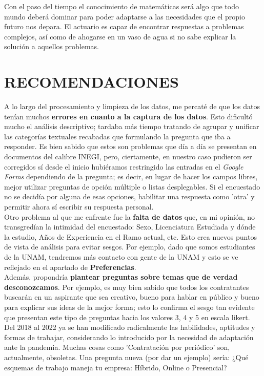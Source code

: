 \documentclass{article}
\begin{document}
Con el paso del tiempo el conocimiento de matemáticas será algo que todo mundo deberá dominar para poder adaptarse a las necesidades que el propio futuro nos depara. El actuario es capaz de encontrar respuestas a problemas complejos, así como de ahogarse en un vaso de agua si no sabe explicar la solución a aquellos problemas. 


\section{RECOMENDACIONES}

A lo largo del procesamiento y limpieza de los datos, me percaté de que los datos tenían muchos \textbf{errores en cuanto a la captura de los datos}. Esto dificultó mucho el análisis descriptivo; tardaba más tiempo tratando de agrupar y unificar las categorías textuales recabadas que formulando la pregunta que iba a responder. Es bien sabido que estos son problemas que día a día se presentan en documentos del calibre INEGI, pero, ciertamente, en nuestro caso pudieron ser corregidos sí desde el inicio hubiéramos restringido las entradas en el \textit{Google Forms} dependiendo de la pregunta; es decir, en lugar de hacer los campos libres, mejor utilizar preguntas de opción múltiple o listas desplegables. Si el encuestado no se decidía por alguna de esas opciones, habilitar una respuesta como 'otra' y permitir ahora sí escribir su respuesta personal. \\

Otro problema al que me enfrente fue la \textbf{falta de datos} que, en mi opinión, no transgredían la intimidad del encuestado: Sexo, Licenciatura Estudiada y dónde la estudio, Años de Experiencia en el Ramo actual, etc. Esto crea nuevos puntos de vista de análisis para evitar sesgos. Por ejemplo, dado que somos estudiantes de la UNAM, tendremos más contacto con gente de la UNAM y esto se ve reflejado en el apartado de \textbf{Preferencias}. \\

Además, propondría \textbf{plantear preguntas sobre temas que de verdad desconozcamos}. Por ejemplo, es muy bien sabido que todos los contratantes buscarán en un aspirante que sea creativo, bueno para hablar en público y bueno para explicar sus ideas de la mejor forma; esto lo confirma el sesgo tan evidente que presentan este tipo de preguntas hacia los valores 3, 4 y 5 en escala likert. \\

Del 2018 al 2022 ya se han modificado radicalmente las habilidades, aptitudes y formas de trabajar, considerando lo introducido por la necesidad de adaptación ante la pandemia. Muchas cosas como 'Contratación por periódico' son, actualmente, obsoletas. Una pregunta nueva (por dar un ejemplo) sería: ¿Qué esquemas de trabajo maneja tu empresa: Híbrido, Online o Presencial?
\end{document}
